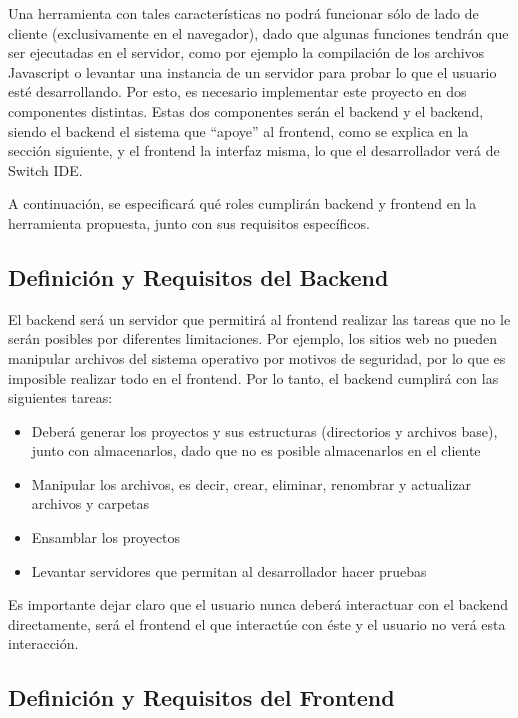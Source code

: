 \documentclass[12pt,spanish,letter]{report}
\begin{document}
Una herramienta con tales características no podrá funcionar sólo de
lado de cliente (exclusivamente en el navegador), dado que algunas
funciones tendrán que ser ejecutadas en el servidor, como por ejemplo la
compilación de los archivos Javascript o levantar una instancia de un
servidor para probar lo que el usuario esté desarrollando. Por esto, es
necesario implementar este proyecto en dos componentes distintas. Estas
dos componentes serán el backend y el backend, siendo el backend el
sistema que ``apoye'' al frontend, como se explica en la sección
siguiente, y el frontend la interfaz misma, lo que el desarrollador verá
de Switch IDE.

A continuación, se especificará qué roles cumplirán backend y frontend
en la herramienta propuesta, junto con sus requisitos específicos.

\subsection{Definición y Requisitos del Backend}

El backend será un servidor que permitirá al frontend realizar las
tareas que no le serán posibles por diferentes limitaciones. Por
ejemplo, los sitios web no pueden manipular archivos del sistema
operativo por motivos de seguridad, por lo que es imposible realizar
todo en el frontend. Por lo tanto, el backend cumplirá con las
siguientes tareas:

\begin{itemize}
\item
  Deberá generar los proyectos y sus estructuras (directorios y archivos
  base), junto con almacenarlos, dado que no es posible almacenarlos en
  el cliente
\item
  Manipular los archivos, es decir, crear, eliminar, renombrar y
  actualizar archivos y carpetas
\item
  Ensamblar los proyectos
\item
  Levantar servidores que permitan al desarrollador hacer pruebas
\end{itemize}

Es importante dejar claro que el usuario nunca deberá interactuar con el
backend directamente, será el frontend el que interactúe con éste y el
usuario no verá esta interacción.

\subsection{Definición y Requisitos del Frontend}
\end{document}

